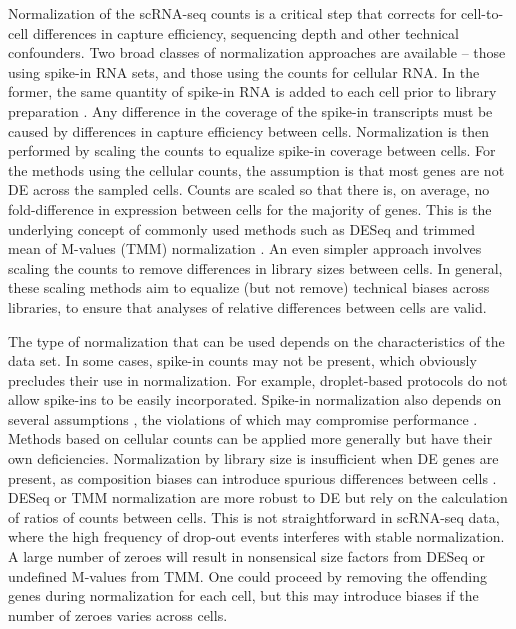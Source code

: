\documentclass{bmcart}
\begin{document}
Normalization of the scRNA-seq counts is a critical step that corrects for cell-to-cell differences in capture efficiency, sequencing depth and other technical confounders.
Two broad classes of normalization approaches are available -- those using spike-in RNA sets, and those using the counts for cellular RNA.
In the former, the same quantity of spike-in RNA is added to each cell prior to library preparation \cite{stegle2015computational}.
Any difference in the coverage of the spike-in transcripts must be caused by differences in capture efficiency between cells.
Normalization is then performed by scaling the counts to equalize spike-in coverage between cells.
For the methods using the cellular counts, the assumption is that most genes are not DE across the sampled cells.
Counts are scaled so that there is, on average, no fold-difference in expression between cells for the majority of genes.
This is the underlying concept of commonly used methods such as DESeq \cite{anders2010differential} and trimmed mean of M-values (TMM) normalization \cite{robinson2010scaling}.
An even simpler approach involves scaling the counts to remove differences in library sizes between cells.
In general, these scaling methods aim to equalize (but not remove) technical biases across libraries, to ensure that analyses of relative differences between cells are valid.

The type of normalization that can be used depends on the characteristics of the data set.
In some cases, spike-in counts may not be present, which obviously precludes their use in normalization.
For example, droplet-based protocols \cite{klein2015droplet,macosko2015highly} do not allow spike-ins to be easily incorporated.
Spike-in normalization also depends on several assumptions \cite{robinson2010scaling,marinov2014singlecell,grun2015design}, 
    the violations of which may compromise performance \cite{risso2014normalization}.
Methods based on cellular counts can be applied more generally but have their own deficiencies.
Normalization by library size is insufficient when DE genes are present, as composition biases can introduce spurious differences between cells \cite{robinson2010scaling}.
DESeq or TMM normalization are more robust to DE but rely on the calculation of ratios of counts between cells.
This is not straightforward in scRNA-seq data, where the high frequency of drop-out events interferes with stable normalization.
A large number of zeroes will result in nonsensical size factors from DESeq or undefined M-values from TMM.
One could proceed by removing the offending genes during normalization for each cell, but this may introduce biases if the number of zeroes varies across cells.
\end{document}
